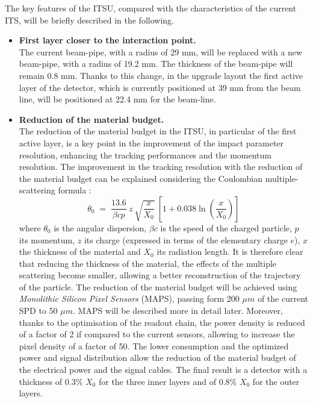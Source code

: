 \noindent
The key features of the ITSU, compared with the characteristics of the current ITS, will be briefly described in the following.
\begin{itemize}
 \item \textbf{First layer closer to the interaction point.}\\
 The current beam-pipe, with a radius of 29 mm, will be replaced with a new beam-pipe, with a radius of 19.2 mm. The thickness of the beam-pipe will remain 0.8 mm. Thanks to this change, in the upgrade layout the first active layer of the detector, which is currently positioned at 39 mm from the beam line,  will be positioned at 22.4 mm for the beam-line.
 \item \textbf{Reduction of the material budget.}\\
 The reduction of the material budget in the ITSU, in particular of the first active layer, is a key point in the improvement of the impact parameter resolution, enhancing the tracking performances and the momentum resolution. The improvement in the tracking resolution with the reduction of the material budget can be explained considering the Coulombian multiple-scattering formula \cite{pdg}:
 \begin{equation*}
  \theta_0 \; = \; \frac{13.6}{\beta c p } \: z \:  \sqrt{\frac{x}{X_0}} \: \left[1 + 0.038\ln\left(\frac{x}{X_0}\right)\right]
 \end{equation*}
 where $\theta_0$ is the angular dispersion, $\beta c$ is the speed of the charged particle, $p$ its momentum, $z$ its charge (expressed in terms of the elementary charge $e$), $x$ the thickness of the material and $X_0$ its radiation length. It is therefore clear that reducing the thickness of the material, the effects of the multiple scattering become smaller, allowing a better reconstruction of the trajectory of the particle. The reduction of the material budget will be achieved using \textit{Monolithic Silicon Pixel Sensors} (MAPS), passing form 200 $\mu m$ of the current SPD to 50 $\mu m$. MAPS will be described more in detail later. Moreover, thanks to the optimisation of the readout chain, the power density is reduced of a factor of 2 if compared to the current sensors, allowing to increase the pixel density of a factor of 50. The lower consumption and the optimized power and signal distribution allow the reduction of the material budget of the electrical power and the signal cables. The final result is a detector with a thickness of 0.3\% $X_0$ for the three inner layers and of 0.8\%  $X_0$ for the outer layers.

\end{itemize}
